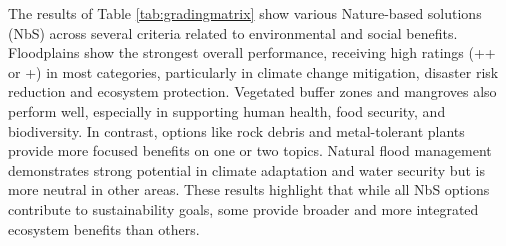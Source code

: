 \begin{table}[H]
  \centering
  \caption{Grading by the seven NbS goals}
  \label{tab:gradingmatrix}
  \small
  \renewcommand{\arraystretch}{1.15}
  \setlength{\tabcolsep}{3pt}

\end{table}

The results of Table \ref{tab:gradingmatrix} show various Nature-based solutions (NbS) across several criteria related to environmental and social benefits. Floodplains show the strongest overall performance, receiving high ratings (++ or +) in most categories, particularly in climate change mitigation, disaster risk reduction and ecosystem protection. Vegetated buffer zones and mangroves also perform well, especially in supporting human health, food security, and biodiversity. In contrast, options like rock debris and metal-tolerant plants provide more focused benefits on one or two topics. Natural flood management demonstrates strong potential in climate adaptation and water security but is more neutral in other areas. These results highlight that while all NbS options contribute to sustainability goals, some provide broader and more integrated ecosystem benefits than others.


